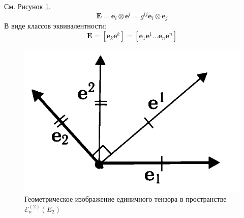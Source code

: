 \begin{definition}
	См. Рисунок \ref{fig:que33}.
	\begin{equation*}
		\mathbf{E} = \mathbf{e}_i\otimes\mathbf{e}^i = g^{ij}\mathbf{e}_i\otimes\mathbf{e}_j
	\end{equation*}
	В виде классов эквивалентности:
	\begin{equation*}
		\mathbf{E}=\left[\mathbf{e}_k\mathbf{e}^k\right]=\left[\mathbf{e}_1\mathbf{e}^1\dots\mathbf{e}_n\mathbf{e}^n\right]
	\end{equation*}
\end{definition}
\begin{figure}[H]
	\centering
	\includegraphics[width=0.4\linewidth]{img/que3_3}
	\caption{Геометрическое изображение единичного тензора в пространстве $\mathcal{E}_n^{(2)}\left(E_2\right)$}
	\label{fig:que33}
\end{figure}
